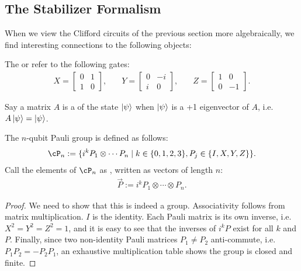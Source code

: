 \subsection{The Stabilizer Formalism}

When we view the Clifford circuits of the previous section more algebraically, we find interesting connections to the following objects:

\begin{definition}
The  or  refer to the following gates:
\begin{equation}
\begin{alignedat}{3}
    X = \begin{bmatrix}
        0 & 1 \\ 1 & 0
    \end{bmatrix}, \quad
    &Y = \begin{bmatrix}
        0 & -i \\ i & 0
    \end{bmatrix}, \quad
    &Z = \begin{bmatrix}
        1 & 0 \\ 0 & -1
    \end{bmatrix}.
\end{alignedat}
\end{equation}
\end{definition}

\begin{definition}
Say a matrix $A$ is a  of the state $\ket{\psi}$ when $\ket\psi$ is a +1 eigenvector of $A$, i.e. $A \ket{\psi} = \ket{\psi}$.
\end{definition}

\begin{definition}
\label{def:pauli-group}
The $n$-qubit Pauli group is defined as follows:
\begin{align}
    \cP_n := \{i^k P_1 \otimes \cdots P_n \mid 
    k \in \{0,1,2,3\}, P_j \in \{I,X,Y,Z\} \}.
\end{align}
Call the elements of $\cP_n$ as , written as vectors of length $n$:
\begin{align}
    \vec{P} := i^k P_1 \otimes \cdots \otimes P_n.
\end{align}
\end{definition}

\begin{proof}
We need to show that this is indeed a group. Associativity follows from matrix multiplication. $I$ is the identity. Each Pauli matrix is its own inverse, i.e. $X^2 = Y^2 = Z^2 = 1$, and it is easy to see that the inverses of $i^kP$ exist for all $k$ and $P$. Finally, since two non-identity Pauli matrices $P_1 \neq P_2$ anti-commute, i.e. $P_1 P_2 = -P_2 P_1$, an exhaustive multiplication table shows the group is closed and finite.
\end{proof}

